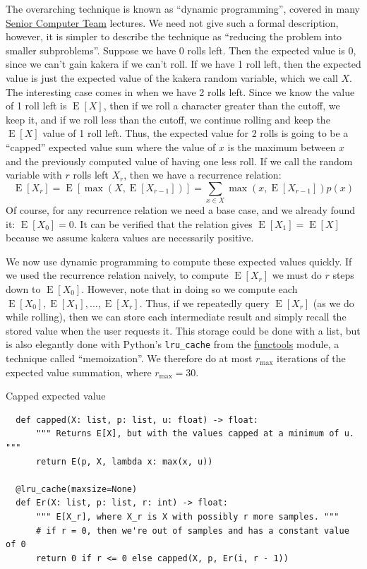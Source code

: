 \documentclass[11pt, oneside]{article}
\DeclareMathOperator{\E}{E}
\theoremstyle{plain}
\theoremstyle{definition}
\begin{document}
The overarching technique is known as \enquote{dynamic programming}, covered in
many \href{https://activities.tjhsst.edu/sct/otherlectures} {Senior Computer
Team} lectures. We need not give such a formal description, however, it is
simpler to describe the technique as \enquote{reducing the problem into smaller
subproblems}. Suppose we have 0 rolls left. Then the expected value is 0,
since we can't gain kakera if we can't roll. If we have 1 roll left, then the
expected value is just the expected value of the kakera random variable, which
we call \( X \). The interesting case comes in when we have 2 rolls left. Since
we know the value of 1 roll left is \( \E[X] \), then if we roll a character
greater than the cutoff, we keep it, and if we roll less than the cutoff, we
continue rolling and keep the \( \E[X] \) value of 1 roll left. Thus, the
expected value for 2 rolls is going to be a \enquote{capped} expected value sum
where the value of \( x \) is the maximum between \( x \) and the previously
computed value of having one less roll. If we call the random variable with
\( r \) rolls left \( X_r \), then we have a recurrence relation:
\[ \E[X_r] = \E[\max(X, \E[X_{r - 1}])] =
\sum_{x \in X} \max(x, \E[X_{r - 1}]) p(x) \]
Of course, for any recurrence relation we need a base case, and we already
found it: \( \E[X_0] = 0 \). It can be verified that the relation gives
\( \E[X_1] = \E[X] \) because we assume kakera values are necessarily positive.

We now use dynamic programming to compute these expected values quickly. If we
used the recurrence relation naively, to compute \( \E[X_r] \) we must do \( r
\) steps down to \( \E[X_0] \). However, note that in doing so we compute each
\( \E[X_0], \E[X_1], \dots, \E[X_r] \). Thus, if we repeatedly query \( \E[X_r]
\) (as we do while rolling), then we can store each intermediate result and
simply recall the stored value when the user requests it. This storage could be
done with a list, but is also elegantly done with Python's \texttt{lru\_cache}
from the \href{https://docs.python.org/3/library/functools.html}{functools}
module, a technique called \enquote{memoization}. We therefore do at most
\( r_\text{max} \) iterations of the expected value summation, where
\( r_\text{max} = 30 \).
\begin{algorithm}[H]
  \caption{Capped expected value}
  \label{alg:capped}
  \setlength{\partopsep}{-\topsep} %
  \begin{verbatim}
  def capped(X: list, p: list, u: float) -> float:
      """ Returns E[X], but with the values capped at a minimum of u. """
      return E(p, X, lambda x: max(x, u))

  @lru_cache(maxsize=None)
  def Er(X: list, p: list, r: int) -> float:
      """ E[X_r], where X_r is X with possibly r more samples. """
      # if r = 0, then we're out of samples and has a constant value of 0
      return 0 if r <= 0 else capped(X, p, Er(i, r - 1))
  \end{verbatim}
\end{algorithm}
\end{document}
